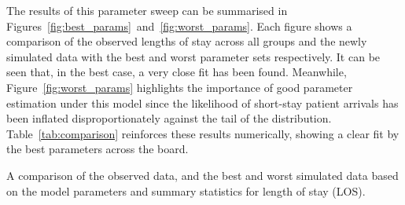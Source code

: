 The results of this parameter sweep can be summarised in
Figures~\ref{fig:best_params}~and~\ref{fig:worst_params}. Each figure shows a
comparison of the observed lengths of stay across all groups and the newly
simulated data with the best and worst parameter sets respectively. It can be
seen that, in the best case, a very close fit has been found. Meanwhile,
Figure~\ref{fig:worst_params} highlights the importance of good parameter
estimation under this model since the likelihood of short-stay patient arrivals
has been inflated disproportionately against the tail of the distribution.
Table~\ref{tab:comparison} reinforces these results numerically, showing a
clear fit by the best parameters across the board.

\begin{table}
    \centering
    \resizebox{\textwidth}{!}{}
    \caption{A comparison of the observed data, and the best and worst simulated
        data based on the model parameters and summary statistics for length of
    stay (LOS).}\label{tab:comparison}
\end{table}
